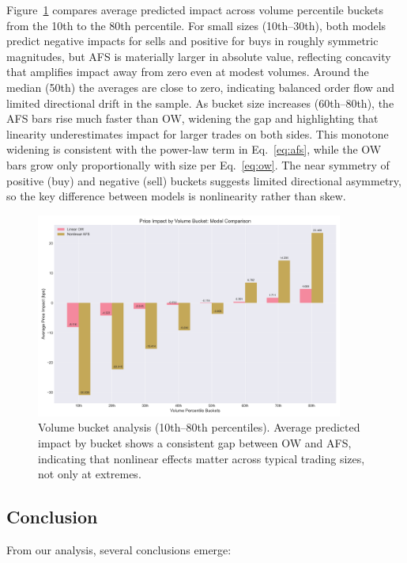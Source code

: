 \documentclass{article}
\begin{document}
Figure~\ref{fig:buckets} compares average predicted impact across volume percentile buckets from the 10th to the 80th percentile. For small sizes (10th–30th), both models predict negative impacts for sells and positive for buys in roughly symmetric magnitudes, but AFS is materially larger in absolute value, reflecting concavity that amplifies impact away from zero even at modest volumes. Around the median (50th) the averages are close to zero, indicating balanced order flow and limited directional drift in the sample. As bucket size increases (60th–80th), the AFS bars rise much faster than OW, widening the gap and highlighting that linearity underestimates impact for larger trades on both sides. This monotone widening is consistent with the power-law term in Eq.~\eqref{eq:afs}, while the OW bars grow only proportionally with size per Eq.~\eqref{eq:ow}. The near symmetry of positive (buy) and negative (sell) buckets suggests limited directional asymmetry, so the key difference between models is nonlinearity rather than skew.

\begin{figure}[H]
\centering
\includegraphics[width=0.9\textwidth]{figures/05_volume_bucket_analysis.png}
\caption{Volume bucket analysis (10th–80th percentiles). Average predicted impact by bucket shows a consistent gap between OW and AFS, indicating that nonlinear effects matter across typical trading sizes, not only at extremes.}
\label{fig:buckets}
\end{figure}


\subsection{Conclusion}

From our analysis, several conclusions emerge:
\end{document}
